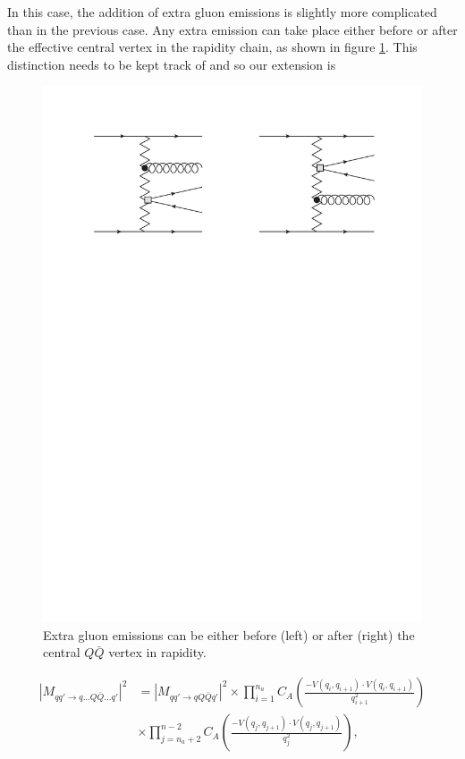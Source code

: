 In this case, the addition of extra gluon emissions is slightly more complicated than in the previous case. Any extra emission can take place either before or after the effective central vertex in the rapidity chain, as shown in figure \ref{fig:5jet_choice}. This distinction needs to be kept track of and so our extension is

\begin{figure}[H]
\centering
\includegraphics[scale=0.75]{Images/5jet_choice.pdf}
\caption{Extra gluon emissions can be either before (left) or after (right) the central $Q\bar{Q}$ vertex in rapidity.}
\label{fig:5jet_choice}
\end{figure}

\begin{equation}
\begin{split}
|M_{qq' \to q...Q\bar{Q}...q'}|^2 &= |M_{qq' \to qQ\bar{Q}q'}|^2 \times \prod_{i=1}^{n_a} C_A \left(\frac{-V(q_i,q_{i+1}) \cdot V(q_i,q_{i+1})}{q_{i+1}^2} \right) \\
&\times \prod_{j=n_a+2}^{n-2} C_A \left(\frac{-V(q_j,q_{j+1}) \cdot V(q_j,q_{j+1})}{q_j^2} \right),
\end{split}
\end{equation}

